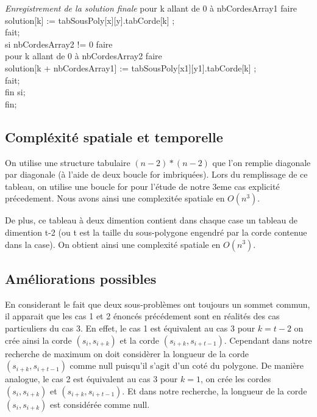 \documentclass[a4paper,10pt]{article}
\begin{document}
\begin{tabbing}
\textit{Enregistrement de la solution finale}
pour k allant de 0 à nbCordesArray1 faire \\
  \> solution[k] := tabSousPoly[x][y].tabCorde[k] ; \\
fait; \\
si nbCordesArray2 != 0 faire \\
  \> pour k allant de 0 à nbCordesArray2 faire \\
    \> \> solution[k + nbCordesArray1] := tabSousPoly[x1][y1].tabCorde[k] ; \\
  \> fait;\\
fin si; \\
fin; \\
\end{tabbing}
 
\subsection{Compléxité spatiale et temporelle}

On utilise une structure tabulaire \((n-2)*(n-2)\) que l'on remplie diagonale par diagonale (à l'aide de deux boucle for imbriquées).
Lors du remplissage de ce tableau, on utilise une boucle for pour l'étude de notre 3eme cas explicité précedement. 
Nous avons ainsi une complexitée spatiale en $O(n^3)$.

De plus, ce tableau à deux dimention contient dans chaque case un tableau de dimention t-2 (ou t est la taille du sous-polygone engendré par la corde contenue dans la case).
On obtient ainsi une complexité spatiale en $O(n^3)$.


\subsection{Améliorations possibles}

En considerant le fait que deux sous-problèmes ont toujours un sommet commun, il apparait que les cas 1 et 2 énoncés précédement sont en réalités des cas particuliers du cas 3.
En effet, le cas 1 est équivalent au cas 3 pour $k=t-2$ on crée ainsi la corde $(s_{i}, s_{i+k})$ et la corde $(s_{i+k}, s_{i+t-1})$.
Cependant dans notre recherche de maximum on doit considèrer la longueur de la corde $(s_{i+k}, s_{i+t-1})$ comme null puisqu'il s'agit d'un coté du polygone.
De manière analogue, le cas 2 est équivalent au cas 3 pour $k=1$, on crée les cordes $(s_{i}, s_{i+k})$ et $(s_{i+k}, s_{i+t-1})$.
Et dans notre recherche, la longueur de la corde $(s_{i}, s_{i+k})$ est considérée comme null.
\end{document}
